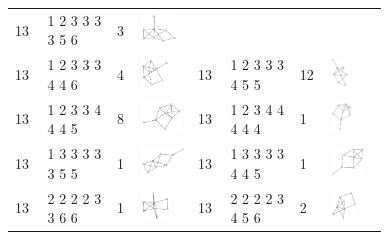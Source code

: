 \begin{footnotesize}
\begin{longtable}{
        m{0.05\linewidth} m{0.15\linewidth} m{0.05\linewidth} m{0.12\linewidth} |
        m{0.05\linewidth} m{0.15\linewidth} m{0.05\linewidth} m{0.12\linewidth}
    }
13 & 1 2 3 3 3 3 5 6 & 3 & \includegraphics[height=0.7151cm]{15-universal-graphs/img/degree-sequences-example-graphs/graph-4-8-43}\\
13 & 1 2 3 3 3 4 4 6 & 4 & \includegraphics[height=0.7151cm]{15-universal-graphs/img/degree-sequences-example-graphs/graph-4-8-44} &
13 & 1 2 3 3 3 4 5 5 & 12 & \includegraphics[height=0.7151cm]{15-universal-graphs/img/degree-sequences-example-graphs/graph-4-8-45}\\
13 & 1 2 3 3 4 4 4 5 & 8 & \includegraphics[height=0.7151cm]{15-universal-graphs/img/degree-sequences-example-graphs/graph-4-8-46} &
13 & 1 2 3 4 4 4 4 4 & 1 & \includegraphics[height=0.7151cm]{15-universal-graphs/img/degree-sequences-example-graphs/graph-4-8-47}\\
13 & 1 3 3 3 3 3 5 5 & 1 & \includegraphics[height=0.7151cm]{15-universal-graphs/img/degree-sequences-example-graphs/graph-4-8-48} &
13 & 1 3 3 3 3 4 4 5 & 1 & \includegraphics[height=0.7151cm]{15-universal-graphs/img/degree-sequences-example-graphs/graph-4-8-49}\\
13 & 2 2 2 2 3 3 6 6 & 1 & \includegraphics[height=0.7151cm]{15-universal-graphs/img/degree-sequences-example-graphs/graph-4-8-50} &
13 & 2 2 2 2 3 4 5 6 & 2 & \includegraphics[height=0.7151cm]{15-universal-graphs/img/degree-sequences-example-graphs/graph-4-8-51}\\

\end{longtable}
\end{footnotesize}
